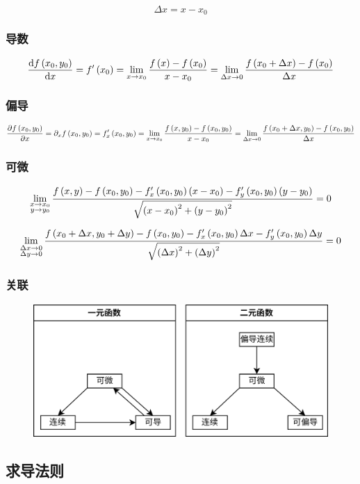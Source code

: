 \documentclass{article}
\begin{document}
\[\Delta x=x-x_0\]

\subsubsection{导数}

\[\frac{\mathrm d f\left(x_0,y_0\right)}{\mathrm d x}=f^\prime\left(x_0\right)=\lim_{x\to x_0}\frac{f\left(x\right)-f\left(x_0\right)}{x-x_0}=\lim_{\Delta x\to0}\frac{f\left(x_0+\Delta x\right)-f\left(x_0\right)}{\Delta x}\]

\subsubsection{偏导}

\[\frac{\partial f\left(x_0,y_0\right)}{\partial x}=\partial_x f\left(x_0,y_0\right)=f_x^\prime\left(x_0,y_0\right)=
    \lim_{x\to x_0}\frac{f\left(x,y_0\right)-f\left(x_0,y_0\right)}{x-x_0}=
    \lim_{\Delta x\to0}\frac{f\left(x_0+\Delta x,y_0\right)-f\left(x_0,y_0\right)}{\Delta x}\]

\subsubsection{可微}

\[\lim_{\substack{x\to x_0 \\ y\to y_0}}\frac{f\left(x,y\right)-f\left(x_0,y_0\right)-f_x^\prime\left(x_0,y_0\right)\left(x-x_0\right)-f_y^\prime\left(x_0,y_0\right)\left(y-y_0\right)}{\sqrt{\left(x-x_0\right)^2+\left(y-y_0\right)^2}}=0\]

\[\lim_{\substack{\Delta x\to0 \\ \Delta y\to0}}\frac{f\left(x_0+\Delta x,y_0+\Delta y\right)-f\left(x_0,y_0\right)-f_x^\prime\left(x_0,y_0\right)\Delta x-f_y^\prime\left(x_0,y_0\right)\Delta y}{\sqrt{\left(\Delta x\right)^2+\left(\Delta y\right)^2}}=0\]

\subsubsection{关联}

\begin{figure}[H]
    \centering
    \includegraphics[width=0.6\linewidth]{RelationshipsForDifferentiation.png}
\end{figure}

\subsection{求导法则}
\end{document}
